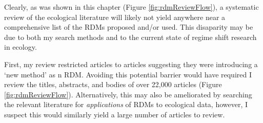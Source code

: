 \documentclass[12pt,twoside,openany]{reedthesis}
\begin{document}
Clearly, as was shown in this chapter (Figure \ref{fig:rdmReviewFlow}), a systematic review of the ecological literature will likely not yield anywhere near a comprehensive list of the RDMs proposed and/or used. This disaparity may be due to both my search methods and to the current state of regime shift research in ecology.

First, my review restricted articles to articles suggesting they were introducing a `new method' as n RDM. Avoiding this potential barrier would have required I review the titles, abstracts, and bodies of over 22,000 articles (Figure \ref{fig:rdmReviewFlow}). Alternatively, this may also be ameliorated by searching the relevant literature for \emph{applications} of RDMs to ecological data, however, I suspect this would similarly yield a large number of articles to review.
\end{document}

